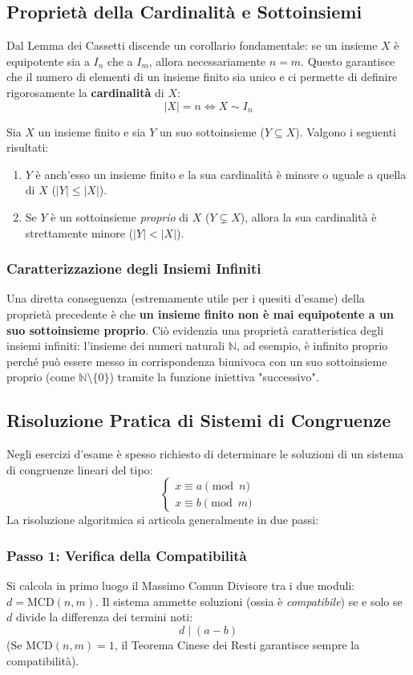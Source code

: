\documentclass[12pt, a4paper]{article}
\begin{document}
\subsection{Proprietà della Cardinalità e Sottoinsiemi}
Dal Lemma dei Cassetti discende un corollario fondamentale: se un insieme $X$ è equipotente sia a $I_n$ che a $I_m$, allora necessariamente $n = m$. Questo garantisce che il numero di elementi di un insieme finito sia unico e ci permette di definire rigorosamente la \textbf{cardinalità} di $X$:
\[ |X| = n \iff X \sim I_n \]

Sia $X$ un insieme finito e sia $Y$ un suo sottoinsieme ($Y \subseteq X$). Valgono i seguenti risultati:
\begin{enumerate}
    \item $Y$ è anch'esso un insieme finito e la sua cardinalità è minore o uguale a quella di $X$ ($|Y| \le |X|$).
    \item Se $Y$ è un sottoinsieme \emph{proprio} di $X$ ($Y \subsetneq X$), allora la sua cardinalità è strettamente minore ($|Y| < |X|$).
\end{enumerate}

\subsubsection*{Caratterizzazione degli Insiemi Infiniti}
Una diretta conseguenza (estremamente utile per i quesiti d'esame) della proprietà precedente è che \textbf{un insieme finito non è mai equipotente a un suo sottoinsieme proprio}. 
Ciò evidenzia una proprietà caratteristica degli insiemi infiniti: l'insieme dei numeri naturali $\mathbb{N}$, ad esempio, è infinito proprio perché può essere messo in corrispondenza biunivoca con un suo sottoinsieme proprio (come $\mathbb{N} \setminus \{0\}$) tramite la funzione iniettiva "successivo".

\subsection{Risoluzione Pratica di Sistemi di Congruenze}
Negli esercizi d'esame è spesso richiesto di determinare le soluzioni di un sistema di congruenze lineari del tipo:
\[
\begin{cases}
    x \equiv a \pmod n \\
    x \equiv b \pmod m
\end{cases}
\]
La risoluzione algoritmica si articola generalmente in due passi:

\subsubsection*{Passo 1: Verifica della Compatibilità}
Si calcola in primo luogo il Massimo Comun Divisore tra i due moduli: $d = \text{MCD}(n, m)$.
Il sistema ammette soluzioni (ossia è \emph{compatibile}) se e solo se $d$ divide la differenza dei termini noti:
\[ d \mid (a - b) \]
(Se $\text{MCD}(n, m) = 1$, il Teorema Cinese dei Resti garantisce sempre la compatibilità).
\end{document}
